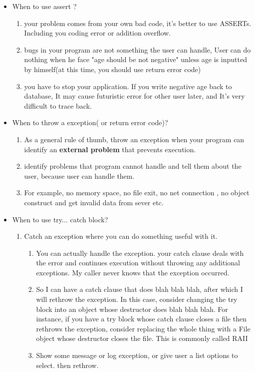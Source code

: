 \documentclass[a4paper,11pt,twoside]{book}
\begin{document}
\begin{itemize}
	\item When to use assert ?
	\begin{enumerate}
		\item your problem comes from your own bad code, it's better to use ASSERTs.  Including you coding error or addition overflow.
		\item bugs in your program are not something the user can handle, User can do nothing when he face "age should be not negative" unless age is inputted by himself(at this time, you should use return error code)
		\item you have to stop your application. If you write negative age back to database, It may cause futuristic error for other user later, and It's very difficult to trace back.
	\end{enumerate}
	
	
	\item When to throw a exception( or return error code)?
	\begin{enumerate}
		\item As a general rule of thumb, throw an exception when your program can identify an \textbf{external problem} that prevents execution.
		\item identify problems that program cannot handle and tell them about the user, because user can handle them.
		\item For example, no memory space, no file exit, no net connection , no object construct and get invalid data from sever etc.
	\end{enumerate}
	
	\item When to use try... catch block?
	\begin{enumerate}
		\item Catch an exception where you can do something useful with it.
		\begin{enumerate}
			\item You can actually handle the exception. your catch clause deals with the error and continues execution without throwing any additional exceptions. My caller never knows that the exception occurred.
			\item So I can have a catch clause that does blah blah blah, after which I will rethrow the exception. In this case, consider changing the try block into an object whose destructor does blah blah blah. For instance, if you have a try block whose catch clause closes a file then rethrows the exception, consider replacing the whole thing with a File object whose destructor closes the file. This is commonly called RAII
			\item Show some message or log exception, or give user a list options to select.  then rethrow.
		\end{enumerate}
		

\end{enumerate}
\end{itemize}
\end{document}
